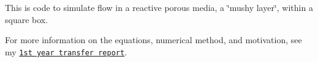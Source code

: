 This is code to simulate flow in a reactive porous media, a \char`\"{}mushy layer\char`\"{}, within a square box.

For more information on the equations, numerical method, and motivation, see my \href{../TransferReport.pdf}{\tt 1st year transfer report}. 